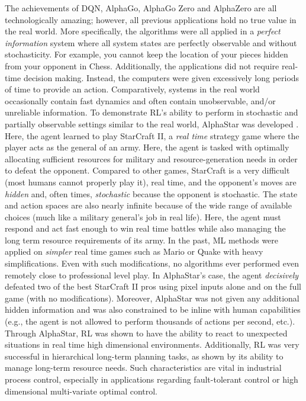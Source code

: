 The achievements of DQN, AlphaGo, AlphaGo Zero and AlphaZero are all technologically amazing; however, all previous applications hold no true value in the real world.  More specifically, the algorithms were all applied in a \textit{perfect information} system where all system states are perfectly observable and without stochasticity.  For example, you cannot keep the location of your pieces hidden from your opponent in Chess. Additionally, the applications did not require real-time decision making. Instead, the computers were given excessively long periods of time to provide an action. Comparatively, systems in the real world occasionally contain fast dynamics and often contain unobservable, and/or unreliable information. To demonstrate RL's ability to perform in stochastic and partially observable settings similar to the real world, AlphaStar was developed \cite{alphastar}. Here, the agent learned to play StarCraft II, a \textit{real time} strategy game where the player acts as the general of an army.  Here, the agent is tasked with optimally allocating sufficient resources for military and resource-generation needs in order to defeat the opponent. Compared to other games, StarCraft is a very difficult (most humans cannot properly play it), real time, and the opponent's moves are \textit{hidden} and, often times, \textit{stochastic} because the opponent is stochastic. The state and action spaces are also nearly infinite because of the wide range of available choices (much like a military general's job in real life). Here, the agent must respond and act fast enough to win real time battles while also managing the long term resource requirements of its army. In the past, ML methods were applied on \textit{simpler} real time games such as Mario or Quake with heavy simplifications. Even with such modifications, no algorithms ever performed even remotely close to professional level play.  In AlphaStar's case, the agent \textit{decisively} defeated two of the best StarCraft II pros using pixel inputs alone and on the full game (with no modifications). Moreover, AlphaStar was not given any additional hidden information and was also constrained to be inline with human capabilities (e.g., the agent is not allowed to perform thousands of actions per second, etc.). Through AlphaStar, RL was shown to have the ability to react to unexpected situations in real time high dimensional environments.  Additionally, RL was very successful in hierarchical long-term planning tasks, as shown by its ability to manage long-term resource needs.  Such characteristics are vital in industrial process control, especially in applications regarding fault-tolerant control or high dimensional multi-variate optimal control.

